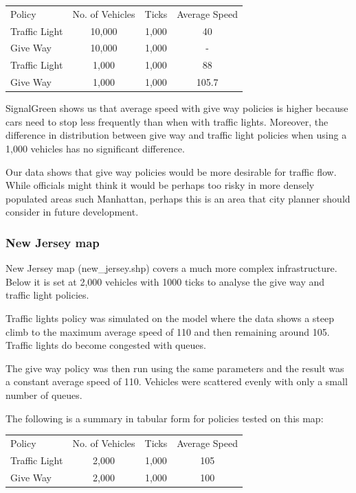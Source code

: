 \documentclass[11pt]{article}
\begin{document}
\begin{enumerate}
\begin{center}
\begin{tabular}{ l | c | c | c }
\hline
Policy & No. of Vehicles & Ticks & Average Speed \\
Traffic Light & 10,000 & 1,000 & 40 \\
Give Way & 10,000 & 1,000 & - \\
Traffic Light & 1,000 & 1,000 & 88 \\
Give Way & 1,000 & 1,000 & 105.7 \\
\hline
\end{tabular}
\end{center}

SignalGreen shows us that average speed with give way policies is higher because cars need to stop less frequently than when with traffic lights. Moreover, the difference in distribution between give way and traffic light policies when using a 1,000 vehicles has no significant difference.

Our data shows that give way policies would be more desirable for traffic flow. While officials might think it would be perhaps too risky in more densely populated areas such Manhattan, perhaps this is an area that city planner should consider in future development.

\subsubsection{New Jersey map}

New Jersey map (new\_jersey.shp)  covers a much more complex infrastructure. Below it is set at 2,000 vehicles with 1000 ticks to analyse the give way and traffic light policies.

Traffic lights policy was simulated on the model where the data shows a steep climb to the maximum average speed of 110 and then remaining around 105. Traffic lights do become congested with queues.


The give way policy was then run using the same parameters and the result was a constant average speed of 110. Vehicles were scattered evenly with only a small number of queues.

The following is a summary in tabular form for policies tested on this map:
\begin{center}
\begin{tabular}{ l | c | c | c }
\hline
Policy & No. of Vehicles & Ticks & Average Speed \\
Traffic Light   & 2,000     &          1,000 &     105  \\
Give Way     &   2,000  &             1,000    &  100 \\
\hline
\end{tabular}
\end{center}


\end{enumerate}
\end{document}
